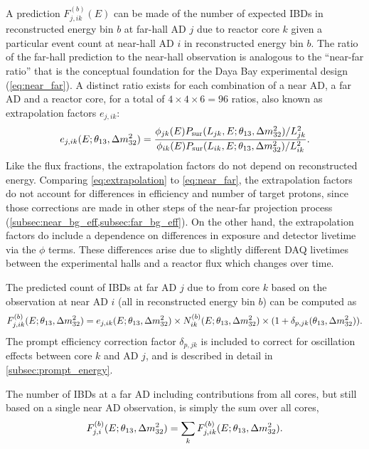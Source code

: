 A prediction $F_{j,ik}^{(b)}(E)$ can be made of the number of expected IBDs
in reconstructed energy bin $b$
at far-hall AD $j$ due to reactor core $k$
given a particular event count at near-hall AD $i$ in reconstructed energy bin $b$.
The ratio of the far-hall prediction to the near-hall observation
is analogous to the ``near-far ratio''
that is the conceptual foundation
for the Daya Bay experimental design (\cref{eq:near_far}).
A distinct ratio exists for each combination of a near AD, a far AD and a reactor core,
for a total of $4 \times 4 \times 6 = 96$ ratios, also known as extrapolation factors
$e_{j,ik}$:
\begin{equation}\label{eq:extrapolation}
    e_{j,ik}(E;\theta_{13},\Delta m^2_{32}) = \frac{
        \phi_{jk}(E)P_\text{sur}(L_{jk}, E;\theta_{13},\Delta m^2_{32})/L_{jk}^2}{
        \phi_{ik}(E)P_\text{sur}(L_{ik}, E;\theta_{13},\Delta m^2_{32})/L_{ik}^2
    }.
\end{equation}
Like the flux fractions, the extrapolation factors
do not depend on reconstructed energy.
Comparing \cref{eq:extrapolation} to \cref{eq:near_far}, the extrapolation factors
do not account for differences in efficiency and number of target protons,
since those corrections are made in other steps of the near-far projection process
(\cref{subsec:near_bg_eff,subsec:far_bg_eff}).
On the other hand, the extrapolation factors do include a dependence on
differences in \nuebar{} exposure and detector livetime via the $\phi$ terms.
These differences arise due to slightly different DAQ livetimes
between the experimental halls
and a reactor flux which changes over time.

The predicted count of IBDs at far AD $j$ due to \nuebar{} from core $k$
based on the observation at near AD $i$ (all in reconstructed energy bin $b$) can be computed as
\begin{equation}\label{eq:far_true_core_pred}
    F_{j,ik}^{(b)}(E;\theta_{13},\Delta m^2_{32}) = e_{j,ik}(E;\theta_{13},\Delta m^2_{32}) \times
        N_{ik}^{(b)}(E;\theta_{13},\Delta m^2_{32}) \times
        (1 + \delta_{p,jk}(\theta_{13}, \Delta m^2_{32})).
\end{equation}
The prompt efficiency correction factor $\delta_{p,jk}$ is included
to correct for oscillation effects between core $k$ and AD $j$,
and is described in detail in \cref{subsec:prompt_energy}.

The number of IBDs at a far AD including contributions from all cores,
but still based on a single near AD observation,
is simply the sum over all cores,
\begin{equation}
    F_{j,i}^{(b)}(E;\theta_{13},\Delta m^2_{32}) = \sum_k F_{j,ik}^{(b)}(E;\theta_{13},\Delta m^2_{32}).
\end{equation}

